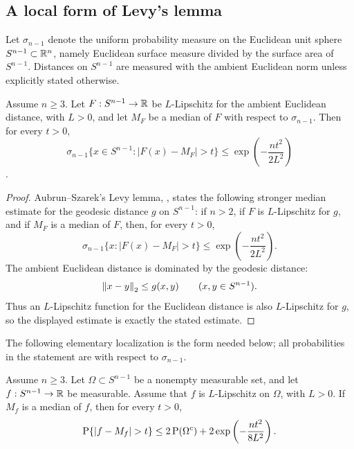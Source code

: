 \subsection{A local form of Levy's lemma}

Let \(\sigma_{n-1}\) denote the uniform probability measure on the Euclidean
unit sphere \(S^{n-1}\subset\mathbb{R}^n\), namely Euclidean surface measure divided
by the surface area of \(S^{n-1}\).  Distances on \(S^{n-1}\) are measured
with the ambient Euclidean norm unless explicitly stated otherwise.

\begin{lemma}
\label{lem:appendixB-spherical-levy}
Assume \(n\ge3\).  Let \(F:S^{n-1}\to\mathbb{R}\) be \(L\)-Lipschitz for the
ambient Euclidean distance, with \(L>0\), and let \(M_F\) be a median of
\(F\) with respect to \(\sigma_{n-1}\).  Then for every \(t>0\),
\[
  \sigma_{n-1}\{x\in S^{n-1}: |F(x)-M_F|> t\}
  \le \exp\left(-\frac{n t^2}{2L^2}\right)
\].
\end{lemma}

\begin{proof}
Aubrun--Szarek's Levy lemma, \cite[Corollary~5.17]{AubrunSzarek2017},
states the following stronger median estimate for the geodesic distance
\(g\) on \(S^{n-1}\): if \(n>2\), if \(F\) is \(L\)-Lipschitz for \(g\),
and if \(M_F\) is a median of \(F\), then, for every \(t>0\),
\[
  \sigma_{n-1}\{x: |F(x)-M_F|>t\}
  \le
  \exp\left(-\frac{n t^2}{2L^2}\right).
\]
The ambient Euclidean distance is dominated by the geodesic distance:
\[
  \left\lVert x-y\right\rVert_2\le g(x,y)\qquad(x,y\in S^{n-1}).
\]
Thus an \(L\)-Lipschitz function for the Euclidean distance is also
\(L\)-Lipschitz for \(g\), so the displayed estimate is exactly the stated
estimate.
\end{proof}

The following elementary localization is the form needed below; all
probabilities in the statement are with respect to \(\sigma_{n-1}\).

\begin{lemma}
\label{lem:appendixB-local-levy}
Assume \(n\ge3\).  Let \(\Omega\subset S^{n-1}\) be a nonempty measurable
set, and let
\(f:S^{n-1}\to\mathbb{R}\) be measurable.  Assume that \(f\) is
\(L\)-Lipschitz on \(\Omega\), with \(L>0\).  If \(M_f\) is a median of
\(f\), then for every \(t>0\),
\[
  \Prob\{|f-M_f|>t\}
  \le
  2\Prob(\Omega^c)
  +
  2\exp\left(-\frac{n t^2}{8L^2}\right).
\]
\end{lemma}

